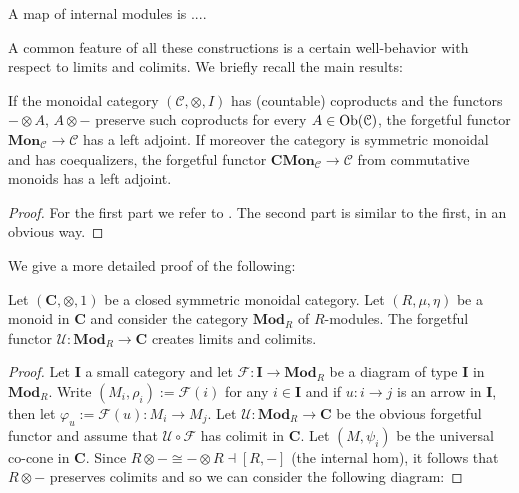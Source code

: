 \begin{refsection}
\begin{defin}
A map of internal modules is ....
\end{defin}

A common feature of all these constructions is a certain well-behavior with respect to limits and colimits. We briefly recall the main results:

\begin{thm} \label{thm adjunction for monoids}
If the monoidal category $(\mathcal C, \otimes, I)$ has (countable) coproducts and the functors $- \otimes A$, $A \otimes -$ preserve such coproducts for every $A \in \operatorname{Ob}(\mathcal C)$, the forgetful functor $\mathbf{Mon}_{\mathcal C} \to \mathcal C$ has a left adjoint. If moreover the category is symmetric monoidal and has coequalizers, the forgetful functor $\mathbf{CMon}_{\mathcal C} \to \mathcal C$ from commutative monoids has a left adjoint.
\end{thm}

\begin{proof}
For the first part we refer to \cite[Thm. VII.3.2]{cwm}. The second part is similar to the first, in an obvious way.
\end{proof}

We give a more detailed proof of the following:

\begin{thm} \label{thm forgetful creates}
Let $(\mathbf C, \otimes, 1)$ be a closed symmetric monoidal category. Let $(R, \mu, \eta)$ be a monoid in $\mathbf C$ and consider the category $\mathbf{Mod}_R$ of $R$-modules. The forgetful functor $\mathcal U \colon \mathbf{Mod}_R \to \mathbf C$ creates limits and colimits.
\end{thm}

\begin{proof}
Let $\mathbf I$ a small category and let $\mathcal F \colon \mathbf I \to \mathbf{Mod}_R$ be a diagram of type $\mathbf I$ in $\mathbf{Mod}_R$. Write $(M_i, \rho_i) := \mathcal F(i)$ for any $i \in \mathbf I$ and if $u \colon i \to j$ is an arrow in $\mathbf I$, then let $\varphi_u := \mathcal F(u) \colon M_i \to M_j$. Let $\mathcal U \colon \mathbf{Mod}_R \to \mathbf C$ be the obvious forgetful functor and assume that $\mathcal U \circ \mathcal F$ has colimit in $\mathbf C$. Let $(M, \psi_i)$ be the universal co-cone in $\mathbf C$. Since $R \otimes - \cong - \otimes R \dashv [R,-]$ (the internal hom), it follows that $R \otimes -$ preserves colimits and so we can consider the following diagram:


\end{proof}
\end{refsection}
